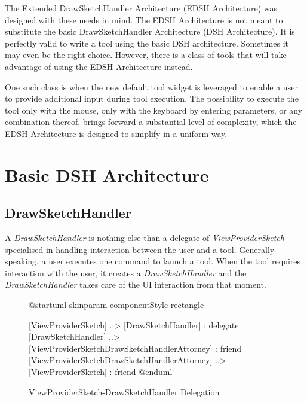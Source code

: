 \documentclass[12pt,twoside,a4paper]{book}
\newcommand{\DrawSketchHandler}{\emph{DrawSketchHandler}}
\newcommand{\ViewProviderSketch}{\emph{ViewProviderSketch}}
\begin{document}
    The Extended DrawSketchHandler Architecture (EDSH Architecture) was designed with these needs in mind. The EDSH Architecture is not meant to substitute the basic DrawSketchHandler Architecture (DSH Architecture). It is perfectly valid to write a tool using the basic DSH architecture. Sometimes it may even be the right choice. However, there is a class of tools that will take advantage of using the EDSH Architecture instead.

    One such class is when the new default tool widget is leveraged to enable a user to provide additional input during tool execution. The possibility to execute the tool only with the mouse, only with the keyboard by entering parameters, or any combination thereof, brings forward a substantial level of complexity, which the EDSH Architecture is designed to simplify in a uniform way.


    \tableofcontents
    \newpage

    \mainmatter

    \chapter{Basic DSH Architecture}

    \section{DrawSketchHandler}
    \label{sec:BasicDSHA:DrawSketchHandler}

    A \DrawSketchHandler{} is nothing else than a delegate of \ViewProviderSketch{} specialised in handling interaction between the user and a tool. Generally speaking, a user executes one command to launch a tool. When the tool requires interaction with the user, it creates a \DrawSketchHandler{} and the \DrawSketchHandler{} takes care of the UI interaction from that moment.

    \begin{figure}
    \centering
    \caption{ViewProviderSketch-DrawSketchHandler Delegation}
        \begin{plantuml}
        @startuml
        skinparam componentStyle rectangle

        [ViewProviderSketch] ..> [DrawSketchHandler] : delegate
        [DrawSketchHandler] ..> [ViewProviderSketchDrawSketchHandlerAttorney] : friend
        [ViewProviderSketchDrawSketchHandlerAttorney] ..> [ViewProviderSketch] : friend
        @enduml
        \end{plantuml}
    \end{figure}
\end{document}
